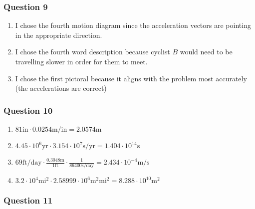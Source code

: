 \subsubsection{Question 9}

\vspace{1em}

\begin{solution}
	\begin{enumerate}[label=\Alph*.]
		\item I chose the fourth motion diagram since the acceleration vectors are pointing in the appropriate direction.
		\item I chose the fourth word description because cyclist $B$ would need to be travelling slower in order for them to meet.
		\item I chose the first pictoral because it aligns with the problem most accurately (the accelerations are correct)
	\end{enumerate}
\end{solution}

\subsubsection{Question 10}

\vspace{1em}

\begin{solution}
	\begin{enumerate}[label=\Alph*.]
		\item $81 \text{in} \cdot 0.0254 \text{m/in} = 2.0574 \text{m}$
		\item $4.45 \cdot 10^{6} \text{yr} \cdot 3.154 \cdot 10^{7} \text{s/yr} = 1.404 \cdot 10^{14} \text{s}$
		\item $69 \text{ft/day} \cdot \frac{0.3048\text{m}}{1\text{ft}} \cdot \frac{1}{86400\text{s/day}} = 2.434 \cdot 10^{-4}\text{m/s}$ 
		\item $3.2 \cdot 10^{4}\text{mi}^2 \cdot 2.58999 \cdot 10^{6} \text{m}^2\text{mi}^2 = 8.288 \cdot 10^{10} \text{m}^2$
	\end{enumerate}
\end{solution}

\subsubsection{Question 11}

\vspace{1em}

